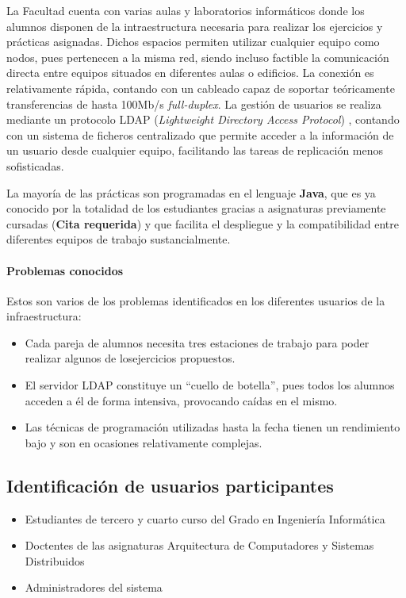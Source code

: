 La Facultad cuenta con varias aulas y laboratorios informáticos donde los alumnos disponen de la intraestructura necesaria para realizar los ejercicios y prácticas asignadas. Dichos espacios permiten utilizar cualquier equipo como nodos, pues pertenecen a la misma red, siendo incluso factible la comunicación directa entre equipos situados en diferentes aulas o edificios. La conexión es relativamente rápida, contando con un cableado capaz de soportar teóricamente transferencias de hasta 100Mb/s \textit{full-duplex}. La gestión de usuarios se realiza mediante un protocolo LDAP (\textit{Lightweight Directory Access Protocol}) \cite{RFC4516-comment}, contando con un sistema de ficheros centralizado que permite acceder a la información de un usuario desde cualquier equipo, facilitando las tareas de replicación menos sofisticadas.

La mayoría de las prácticas son programadas en el lenguaje \textbf{Java}, que es ya conocido por la totalidad de los estudiantes gracias a asignaturas previamente cursadas (\textbf{Cita requerida}) y que facilita el despliegue y la compatibilidad entre diferentes equipos de trabajo sustancialmente.

\paragraph{Problemas conocidos}

Estos son varios de los problemas identificados en los diferentes usuarios de la infraestructura:

\begin{itemize}
  \item Cada pareja de alumnos necesita tres estaciones de trabajo para poder realizar algunos de losejercicios propuestos.
  \item El servidor LDAP constituye un ``cuello de botella'', pues todos los alumnos acceden a él de forma intensiva, provocando caídas en el mismo.
  \item Las técnicas de programación utilizadas hasta la fecha tienen un rendimiento bajo y son en ocasiones relativamente complejas.
\end{itemize}

\subsection{Identificación de usuarios participantes}

\begin{itemize}

  \item Estudiantes de tercero y cuarto curso del Grado en Ingeniería Informática
  \item Doctentes de las asignaturas Arquitectura de Computadores y Sistemas Distribuidos
  \item Administradores del sistema
\end{itemize}

